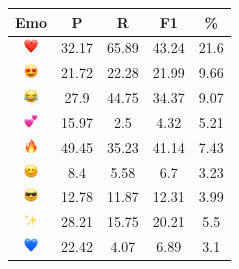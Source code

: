 \documentclass{article}
\begin{document}
\begin{table}
\centering
\begin{tabular}{|c|ccc|c|} \hline
\textbf{Emo} & \textbf{P} & \textbf{R} & \textbf{F1} & \textbf{\%} \\ \hline
\includegraphics[height=0.37cm,width=0.37cm]{img/red_heart.png} & 32.17 & 65.89 & 43.24 & 21.6\\ 
\includegraphics[height=0.37cm,width=0.37cm]{img/smiling_face_with_hearteyes.png} & 21.72 & 22.28 & 21.99 & 9.66\\ 
\includegraphics[height=0.37cm,width=0.37cm]{img/face_with_tears_of_joy.png} & 27.9 & 44.75 & 34.37 & 9.07\\ 
\includegraphics[height=0.37cm,width=0.37cm]{img/two_hearts.png} & 15.97 & 2.5 & 4.32 & 5.21\\ 
\includegraphics[height=0.37cm,width=0.37cm]{img/fire.png} & 49.45 & 35.23 & 41.14 & 7.43\\ 
\includegraphics[height=0.37cm,width=0.37cm]{img/smiling_face_with_smiling_eyes.png} & 8.4 & 5.58 & 6.7 & 3.23\\ 
\includegraphics[height=0.37cm,width=0.37cm]{img/smiling_face_with_sunglasses.png} & 12.78 & 11.87 & 12.31 & 3.99\\ 
\includegraphics[height=0.37cm,width=0.37cm]{img/sparkles.png} & 28.21 & 15.75 & 20.21 & 5.5\\ 
\includegraphics[height=0.37cm,width=0.37cm]{img/blue_heart.png} & 22.42 & 4.07 & 6.89 & 3.1\\ 

\end{tabular}
\end{table}
\end{document}
